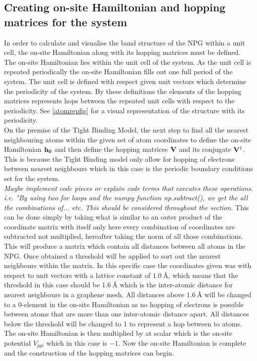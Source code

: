 \subsection{Creating on-site Hamiltonian and hopping matrices for the system}
In order to calculate and visualise the band structure of the NPG within a unit cell, the on-site Hamiltonian along with its hopping matrices must be defined. The on-site Hamiltonian lies within the unit cell of the system. As the unit cell is repeated periodically the on-site Hamiltonian fills out one full period of the system. The unit cell is defined with respect given unit vectors which determine the periodicity of the system. By these definitions the elements of the hopping matrices represents hops between the repeated unit cells with respect to the periodicity. See \cref{atomrepfig} for a visual representation of the structure with its periodicity. \\
On the premise of the Tight Binding Model, the next step to find all the nearest neighbouring atoms within the given set of atom coordinates to define the on-site Hamiltonian \(\bf{h}_0\) and then define the hopping matrices \(\bf{V}\) and its conjugate \(\bf{V}^{\dagger}\). This is because the Tight Binding model only allow for hopping of electrons between nearest neighbours which in this case is the periodic boundary conditions set for the system.\\ \textit{Maybe implement code pieces or explain code terms that executes these operations. i.e. "By using two for loops and the numpy function np.subtract(), we get the all the combinations of... etc. This should be considered throughout the section.} This can be done simply by taking what is similar to an outer product of the coordinate matrix with itself only here every combination of coordinates are subtracted not multiplied, hereafter taking the norm of all those combinations. This will produce a matrix which contain all distances between all atoms in the NPG. Once obtained a threshold will be applied to sort out the nearest neighbours within the matrix. In this specific case the coordinates given was with respect to unit vectors with a lattice constant of \(\SI{1.0}{\angstrom}\), which means that the threshold in this case should be \(\SI{1.6}{\angstrom}\) which is the inter-atomic distance for nearest neighbours in a graphene mesh. All distances above \(\SI{1.6}{\angstrom}\) will be changed to a 0-element in the on-site Hamiltonian as no hopping of electrons is possible between atoms that are more than one inter-atomic distance apart. All distances below the threshold will be changed to 1 to represent a hop between to atoms. The on-site Hamiltonian is then multiplied by at scalar which is the on-site potential \(V_{ppi}\) which in this case is \(-1\). Now the on-site Hamiltonian is complete and the construction of the hopping matrices can begin. \\
